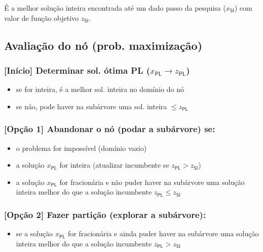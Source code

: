 \documentclass[10pt, a4paper]{article}
\begin{document}
\begin{multicols}{2}
É a melhor solução inteira encontrada até um dado passo da pesquisa (\(x_\textsf{SI}\)) com valor de função objetivo \(z_\textsf{SI}\).

\subsection{Avaliação do nó (prob. maximização)}

\subsubsection{[Início] Determinar sol. ótima PL (\(x_\textsf{PL} \rightarrow z_\textsf{PL}\))}

\begin{itemize}
    \item se for inteira, é a melhor sol. inteira no domínio do nó
    \item se não, pode haver na subárvore uma sol. inteira \(\le z_\textsf{PL}\)
\end{itemize}

\subsubsection{[Opção 1] Abandonar o nó (podar a subárvore) se:}

\begin{itemize}
    \item o problema for impossível (domínio vazio)
    \item a solução \(x_\textsf{PL}\) for inteira (atualizar incumbente se \(z_\textsf{PL} > z_\textsf{SI}\))
    \item a solução \(x_\textsf{PL}\) for fracionária e não puder haver na subárvore uma solução inteira melhor do que a solução incumbente \(z_\textsf{PL} \le z_\textsf{SI}\)
\end{itemize}

\subsubsection{[Opção 2] Fazer partição (explorar a subárvore):}

\begin{itemize}
    \item se a solução \(x_\textsf{PL}\) for fracionária e ainda puder haver na subárvore uma solução inteira melhor do que a solução incumbente \(z_\textsf{PL} > z_\textsf{SI}\)
\end{itemize}


\end{multicols}
\end{document}

